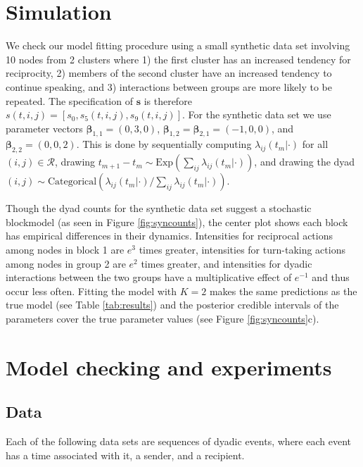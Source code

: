 \documentclass{article}
\begin{document}
\section{Simulation}

We check our model fitting procedure using a small synthetic data set involving 10 nodes from 2 clusters where 1) the first cluster has an increased tendency for reciprocity, 2) members of the second cluster have an increased tendency to continue speaking, and 3) interactions between groups are more likely to be repeated.  The specification of $\textbf{s}$ is therefore $s(t,i,j) = [s_0, s_{5}(t,i,j), s_{9}(t,i,j)]$.  For the synthetic data set we use parameter vectors $\boldsymbol{\beta}_{1,1} = (0,3,0)$,  $\boldsymbol{\beta}_{1,2} = \boldsymbol{\beta}_{2,1} = (-1,0,0)$, and $\boldsymbol{\beta}_{2,2} = (0,0,2)$.  This is done by sequentially computing $\lambda_{ij}(t_m|\cdot)$ for all $(i,j) \in \mathcal{R}$, drawing $t_{m+1}-t_m \sim \mbox{Exp}(\sum_{ij} \lambda_{ij}(t_m|\cdot))$, and drawing the dyad $(i,j) \sim \mbox{Categorical}(\lambda_{ij}(t_m|\cdot) / \sum_{ij}\lambda_{ij}(t_m|\cdot))$.  

Though the dyad counts for the synthetic data set suggest a stochastic blockmodel (as seen in Figure  \ref{fig:syncounts}),  the center plot shows each block has empirical differences in their dynamics.  Intensities for reciprocal actions among nodes in block 1 are $e^3$ times greater, intensities for turn-taking actions among nodes in group 2 are $e^2$ times greater, and intensities for dyadic interactions between the two groups have a multiplicative effect of $e^{-1}$ and thus occur less often.  Fitting the model with $K=2$ makes the same predictions as the true model (see Table \ref{tab:results}) and the posterior credible intervals of the parameters cover the true parameter values (see Figure \ref{fig:syncounts}c).

\section{Model checking and experiments}

\subsection{Data}

Each of the following data sets are sequences of dyadic events, where each event has a time associated with it, a sender, and a recipient.
\end{document}
